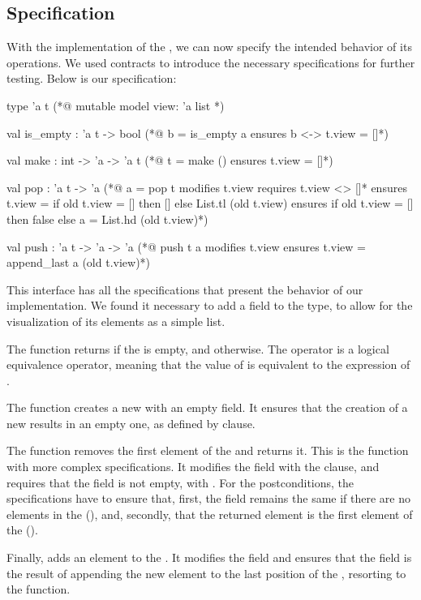 \subsection{Specification}
\label{subsec:specification}

With the implementation of the , we can now specify the intended behavior 
of its operations. We used \gospellang contracts to introduce the necessary specifications 
for further testing. Below is our specification:

\begin{gospel}
    type 'a t
    (*@ mutable model view: 'a list *)

    val is_empty : 'a t -> bool
    (*@ b = is_empty a 
        ensures b <-> t.view = []*)

    val make : int -> 'a -> 'a t
    (*@ t = make ()
        ensures t.view = []*)

    val pop : 'a t -> 'a
    (*@ a = pop t 
        modifies t.view
        requires t.view <> []*
        ensures t.view = 
            if old t.view = []
            then [] 
            else List.tl (old t.view)
        ensures if old t.view = [] then false
            else a = List.hd (old t.view)*)

    val push : 'a t -> 'a -> 'a
    (*@ push t a
        modifies t.view
        ensures t.view = append_last a (old t.view)*)
\end{gospel}

This interface has all the specifications that present the behavior of our  
implementation. We found it necessary to add a  field to the  
type, to allow for the visualization of its elements as a simple \ocaml list. 

The  function returns  if the  is empty, and 
 otherwise. The \gosp{<->} operator is a logical equivalence operator, 
meaning that the value of  is equivalent to the expression of . 

The  function creates a new  with an empty  field. 
It ensures that the creation of a new  results in an empty one, as 
defined by  clause.

The  function removes the first element of the  and returns it. 
This is the function with more complex specifications. It modifies the  field 
with the  clause, and requires that the  field is not empty, with 
. For the postconditions, the specifications have to ensure that, first, 
the  field remains the same if there are no elements in the  
(), and, secondly, 
that the returned element is the first element of the  ().

Finally,  adds an element to the . It modifies the  field 
and ensures that the  field is the result of appending the new element to the 
last position of the , resorting to the  function.